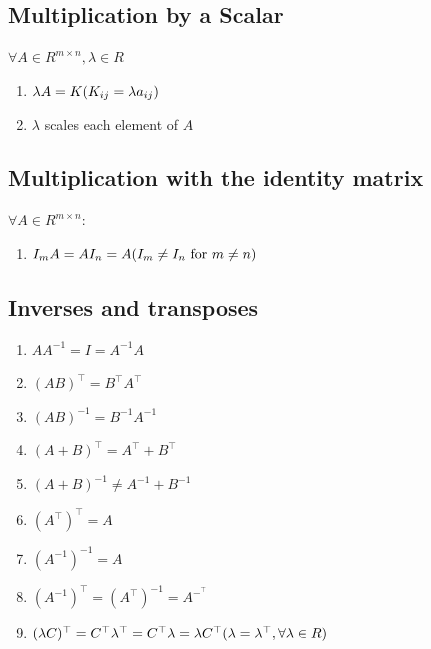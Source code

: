 \subsection{Multiplication by a Scalar \cite{mfml-1}} \label{matrix: Multiplication by a Scalar}
$\forall A \in  R^{m\times n} , \lambda  \in  R$

\begin{enumerate}

    \item $\lambda A = K \hfill (K_{ij} = \lambda a_{ij})$

    \item $\lambda$ scales each element of $A$
\end{enumerate}


\subsection{Multiplication with the identity matrix}
$\forall A \in  R^{m\times n}$:

\begin{enumerate}
    \item $I_mA = AI_n = A \hfill (I_m \neq I_n \text{ for } m \neq n)$
\end{enumerate}


\subsection{Inverses and transposes}
\begin{enumerate}[itemsep=0.2cm]
    \item $AA^{-1} = I = A^{-1}A$

    \item $(AB)^\top  = B^\top A^\top $

    \item $(AB)^{-1} = B^{-1}A^{-1}$

    \item $(A + B)^\top  = A^\top  + B^\top $

    \item $(A + B)^{-1} \neq A^{-1} + B^{-1}$

    \item $(A^\top )^\top  = A$

    \item $(A^{-1})^{-1} = A$

    \item $(A^{-1})^\top  = (A^\top )^{-1} = A^{-^\top} $

    \item $(\lambda C)^\top  = C^\top \lambda ^\top  = C^\top \lambda  = \lambda C^\top  \hfill (\lambda  = \lambda ^\top , \forall\lambda  \in R)$
\end{enumerate}


